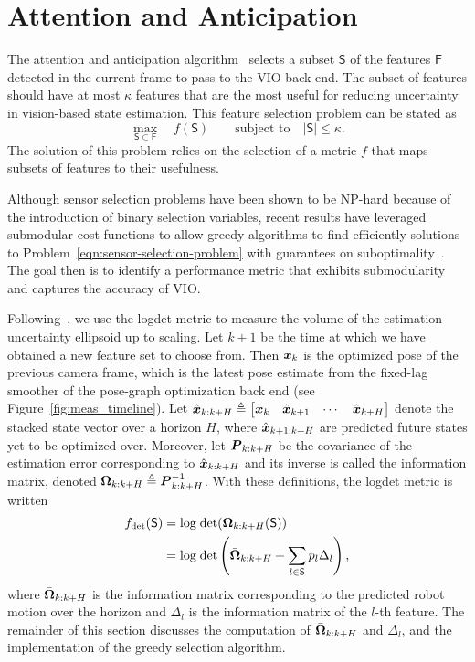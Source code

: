 
\section{Attention and Anticipation}\label{sec:anticipation}

The attention and anticipation algorithm~\cite{Carlone2017} selects a subset $\mathsf{S}$ of the features $\mathsf{F}$ detected in the current frame to pass to the VIO back end.
The subset of features should have at most $\kappa$ features that are the most useful for reducing uncertainty in vision-based state estimation.
This feature selection problem can be stated as
\begin{equation}\label{eqn:sensor-selection-problem}
\max_{\mathsf{S}\subset\mathsf{F}} \quad f(\mathsf{S}) \qquad \text{subject to}\quad |\mathsf{S}|\le\kappa.
\end{equation}
The solution of this problem relies on the selection of a metric $f$ that maps subsets of features to their usefulness.

Although sensor selection problems have been shown to be NP-hard because of the introduction of binary selection variables, recent results have leveraged submodular cost functions to allow greedy algorithms to find efficiently solutions to Problem~\eqref{eqn:sensor-selection-problem} with guarantees on suboptimality~\cite{Shamaiah2010}.
The goal then is to identify a performance metric that exhibits submodularity and captures the accuracy of VIO.

Following~\cite{Carlone2017}, we use the logdet metric to measure the volume of the estimation uncertainty ellipsoid up to scaling.
Let $k+1$ be the time at which we have obtained a new feature set to choose from.
Then $\boldsymbol x_k$ is the optimized pose of the previous camera frame, which is the latest pose estimate from the fixed-lag smoother of the pose-graph optimization back end (see Figure~\ref{fig:meas_timeline}).
Let $\hat{\boldsymbol x}_{k:k+H}\triangleq\begin{bmatrix}\boldsymbol x_k&\hat{\boldsymbol x}_{k+1}&\cdots&\hat{\boldsymbol x}_{k+H}\end{bmatrix}$ denote the stacked state vector over a horizon $H$, where $\hat{\boldsymbol x}_{k+1:k+H}$ are predicted future states yet to be optimized over.
Moreover, let ${\boldsymbol P}_{k:k+H}$ be the covariance of the estimation error corresponding to $\hat{\boldsymbol x}_{k:k+H}$ and its inverse is called the information matrix, denoted ${\boldsymbol \Omega}_{k:k+H}\triangleq{\boldsymbol P}_{k:k+H}^{-1}$.
With these definitions, the logdet metric is written
\begin{align}
f_\text{det}(\mathsf{S}) &= \text{log}\;\text{det}({\boldsymbol \Omega}_{k:k+H}(\mathsf{S}))\\
&= \text{log}\;\text{det}\left(\bar{\boldsymbol \Omega}_{k:k+H} + \sum_{l\in\mathsf{S}}p_l\Delta_l\right),
\end{align}
where $\bar{\boldsymbol \Omega}_{k:k+H}$ is the information matrix corresponding to the predicted robot motion over the horizon and $\Delta_l$ is the information matrix of the $l$-th feature.
The remainder of this section discusses the computation of $\bar{\boldsymbol \Omega}_{k:k+H}$ and $\Delta_l$, and the implementation of the greedy selection algorithm.

